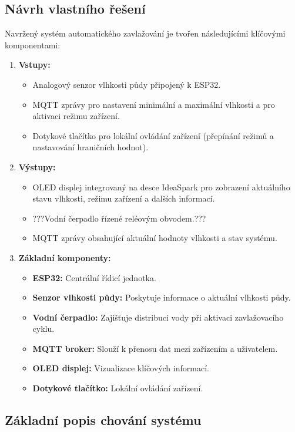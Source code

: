 \documentclass[a4paper, 11pt]{article}
\begin{document}
\subsection{Návrh vlastního řešení}

Navržený systém automatického zavlažování je tvořen následujícími klíčovými komponentami:
\begin{enumerate}
    \item \textbf{Vstupy:}
    \begin{itemize}
        \item Analogový senzor vlhkosti půdy připojený k ESP32.
        \item MQTT zprávy pro nastavení minimální a maximální vlhkosti a pro aktivaci režimu zařízení.
        \item Dotykové tlačítko pro lokální ovládání zařízení (přepínání režimů a nastavování hraničních hodnot).
    \end{itemize}
    \item \textbf{Výstupy:}
    \begin{itemize}
        \item OLED displej integrovaný na desce IdeaSpark pro zobrazení aktuálního stavu vlhkosti, režimu zařízení a dalších informací.
        \item ???Vodní čerpadlo řízené reléovým obvodem.???
        \item MQTT zprávy obsahující aktuální hodnoty vlhkosti a stav systému.
    \end{itemize}
    \item \textbf{Základní komponenty:}
    \begin{itemize}
        \item \textbf{ESP32:} Centrální řídicí jednotka.
        \item \textbf{Senzor vlhkosti půdy:} Poskytuje informace o aktuální vlhkosti půdy.
        \item \textbf{Vodní čerpadlo:} Zajišťuje distribuci vody při aktivaci zavlažovacího cyklu.
        \item \textbf{MQTT broker:} Slouží k přenosu dat mezi zařízením a uživatelem.
        \item \textbf{OLED displej:} Vizualizace klíčových informací.
        \item \textbf{Dotykové tlačítko:} Lokální ovládání zařízení.
    \end{itemize}
\end{enumerate}

\subsection{Základní popis chování systému}
\end{document}
